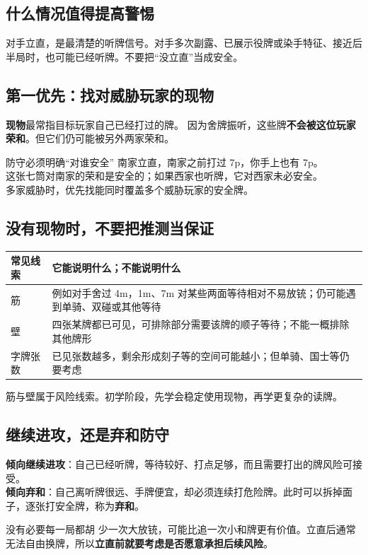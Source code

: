 \documentclass[UTF8,a4paper,zihao=5,fontset=fandol]{ctexart}
\newcommand{\smalltext}[1]{{\small\color{muted}#1}}
\newcommand{\key}[1]{\textbf{\color{teal}#1}}
\newcommand{\notation}[1]{{\ttfamily\color{teal}#1}}
\begin{document}
\subsection{什么情况值得提高警惕}
对手立直，是最清楚的听牌信号。对手多次副露、已展示役牌或染手特征、接近后半局时，也可能已经听牌。不要把“没立直”当成安全。

\subsection{第一优先：找对威胁玩家的现物}
\key{现物}最常指目标玩家自己已经打过的牌。
因为舍牌振听，这些牌\textbf{不会被这位玩家荣和}。但它们仍可能被另外两家荣和。

\begin{example}{防守必须明确“对谁安全”}
南家立直，南家之前打过 \notation{7p}，你手上也有 \notation{7p}。\\
这张七筒对南家的荣和是安全的；如果西家也听牌，它对西家未必安全。\\
多家威胁时，优先找能同时覆盖多个威胁玩家的安全牌。
\end{example}

\subsection{没有现物时，不要把推测当保证}
\par\noindent\begin{tabularx}{\linewidth}{L{22mm}Y}
\toprule
常见线索 & 它能说明什么；不能说明什么\\
\midrule
筋 & 例如对手舍过 \notation{4m}，\notation{1m}、\notation{7m} 对某些两面等待相对不易放铳；仍可能遇到单骑、双碰或其他等待\\
壁 & 四张某牌都已可见，可排除部分需要该牌的顺子等待；不能一概排除其他牌形\\
字牌张数 & 已见张数越多，剩余形成刻子等的空间可能越小；但单骑、国士等仍要考虑\\
\bottomrule
\end{tabularx}\par\vspace{3pt}
\smalltext{筋与壁属于风险线索。初学阶段，先学会稳定使用现物，再学更复杂的读牌。}

\subsection{继续进攻，还是弃和防守}
\textbf{倾向继续进攻}：自己已经听牌，等待较好、打点足够，而且需要打出的牌风险可接受。\\
\textbf{倾向弃和}：自己离听牌很远、手牌便宜，却必须连续打危险牌。此时可以拆掉面子，逐张打安全牌，称为\textbf{弃和}。
\begin{alert}{没有必要每一局都胡}
少一次大放铳，可能比追一次小和牌更有价值。立直后通常无法自由换牌，所以\textbf{立直前就要考虑是否愿意承担后续风险}。
\end{alert}
\end{document}
